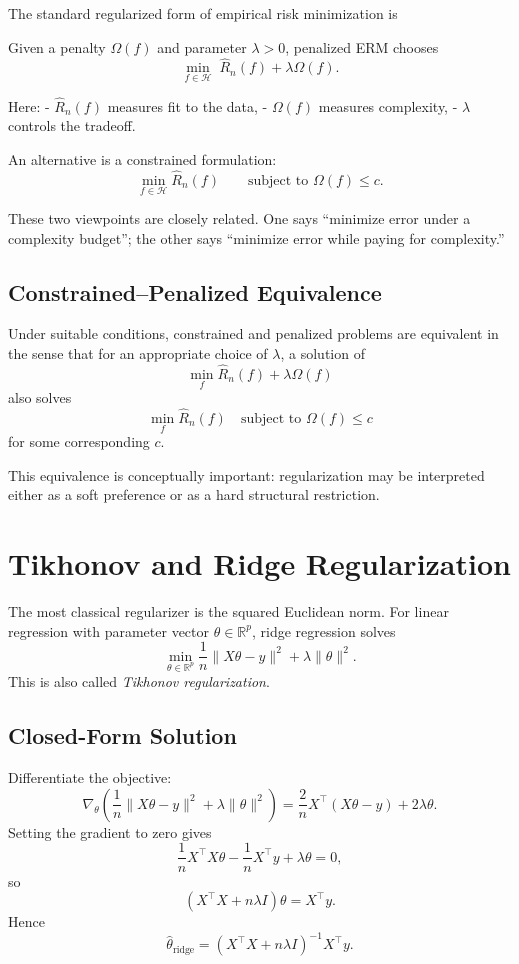 The standard regularized form of empirical risk minimization is

\begin{definition}
Given a penalty $\Omega(f)$ and parameter $\lambda>0$, penalized ERM chooses
\[
\min_{f\in\mathcal H} \; \widehat R_n(f)+\lambda \Omega(f).
\]
\end{definition}

Here:
- $\widehat R_n(f)$ measures fit to the data,
- $\Omega(f)$ measures complexity,
- $\lambda$ controls the tradeoff.

An alternative is a constrained formulation:
\[
\min_{f\in\mathcal H} \widehat R_n(f)
\qquad
\text{subject to } \Omega(f)\le c.
\]

These two viewpoints are closely related. One says “minimize error under a complexity budget”; the other says “minimize error while paying for complexity.”

\subsection{Constrained--Penalized Equivalence}

Under suitable conditions, constrained and penalized problems are equivalent in the sense that for an appropriate choice of $\lambda$, a solution of
\[
\min_f \widehat R_n(f)+\lambda\Omega(f)
\]
also solves
\[
\min_f \widehat R_n(f)\quad \text{subject to } \Omega(f)\le c
\]
for some corresponding $c$.

This equivalence is conceptually important: regularization may be interpreted either as a soft preference or as a hard structural restriction.

\section{Tikhonov and Ridge Regularization}

The most classical regularizer is the squared Euclidean norm. For linear regression with parameter vector $\theta\in\mathbb R^p$, ridge regression solves
\[
\min_{\theta\in\mathbb R^p}
\frac1n\|X\theta-y\|^2+\lambda \|\theta\|^2.
\]
This is also called \emph{Tikhonov regularization}.

\subsection{Closed-Form Solution}

Differentiate the objective:
\[
\nabla_\theta\!\left(\frac1n\|X\theta-y\|^2+\lambda\|\theta\|^2\right)
=
\frac{2}{n}X^\top(X\theta-y)+2\lambda\theta.
\]
Setting the gradient to zero gives
\[
\frac{1}{n}X^\top X\theta - \frac{1}{n}X^\top y + \lambda\theta = 0,
\]
so
\[
\left(X^\top X+n\lambda I\right)\theta = X^\top y.
\]
Hence
\[
\hat\theta_{\mathrm{ridge}}
=
\left(X^\top X+n\lambda I\right)^{-1}X^\top y.
\]

